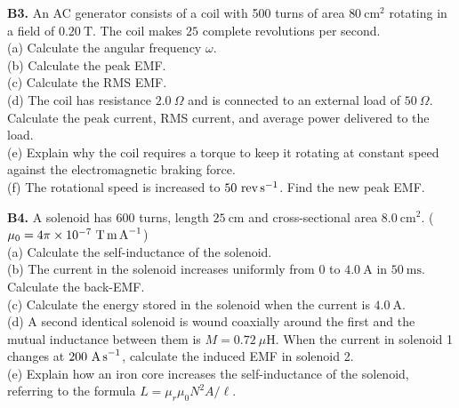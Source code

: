 \begin{exercisebox}[26]
\textbf{B3.} An AC generator consists of a coil
with 500 turns of area $80\ \text{cm}^2$ rotating
in a field of $0.20\ \text{T}$. The coil makes
$25$ complete revolutions per second.\\[4pt]
(a) Calculate the angular frequency $\omega$.\\
(b) Calculate the peak EMF.\\
(c) Calculate the RMS EMF.\\
(d) The coil has resistance $2.0\ \Omega$ and is
connected to an external load of $50\ \Omega$.
Calculate the peak current, RMS current, and
average power delivered to the load.\\
(e) Explain why the coil requires a torque to keep
it rotating at constant speed against the
electromagnetic braking force.\\
(f) The rotational speed is increased to
$50\ \text{rev\,s}^{-1}$. Find the new peak EMF.
\hfill{}

\vspace{0.4cm}

\textbf{B4.} A solenoid has $600$ turns, length
$25\ \text{cm}$ and cross-sectional area
$8.0\ \text{cm}^2$.
($\mu_0 = 4\pi\times10^{-7}\ \text{T\,m\,A}^{-1}$)\\[4pt]
(a) Calculate the self-inductance of the solenoid.\\
(b) The current in the solenoid increases uniformly
from $0$ to $4.0\ \text{A}$ in $50\ \text{ms}$.
Calculate the back-EMF.\\
(c) Calculate the energy stored in the solenoid
when the current is $4.0\ \text{A}$.\\
(d) A second identical solenoid is wound coaxially
around the first and the mutual inductance between
them is $M = 0.72\ \mu\text{H}$. When the current
in solenoid 1 changes at $200\ \text{A\,s}^{-1}$,
calculate the induced EMF in solenoid 2.\\
(e) Explain how an iron core increases the
self-inductance of the solenoid, referring to the
formula $L = \mu_r\mu_0 N^2A/\ell$.
\hfill{}

\begin{center}
\end{center}


\end{exercisebox}
